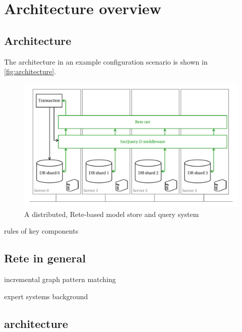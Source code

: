 \section{Architecture overview}


\subsection{Architecture}
\label{architecture}
The \iqd{} architecture in an example configuration scenario is shown in \autoref{fig:architecture}.

\begin{figure}[!t]
\begin{center}
\includegraphics[width=.95\columnwidth]{figures/architecture}
\caption{A distributed, Rete-based model store and query system}
\label{fig:architecture}
\end{center}
\end{figure}


rules of key components

\subsection{Rete in general}
\label{subsec:rete}

incremental graph pattern matching

expert systems background


\subsection{\iqd architecture}

